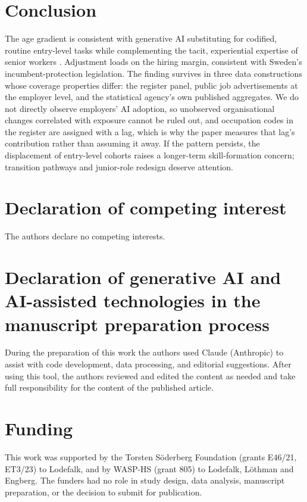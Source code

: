 \documentclass[preprint,12pt,authoryear]{elsarticle}
\begin{document}
\section{Conclusion}\label{sec:conc}

The age gradient is consistent with generative AI substituting for codified, routine entry-level tasks while complementing the tacit, experiential expertise of senior workers \citep{acemoglu2019automation,acemoglu2026proworker}. Adjustment loads on the hiring margin, consistent with Sweden's incumbent-protection legislation. The finding survives in three data constructions whose coverage properties differ: the register panel, public job advertisements at the employer level, and the statistical agency's own published aggregates. We do not directly observe employers' AI adoption, so unobserved organisational changes correlated with exposure cannot be ruled out, and occupation codes in the register are assigned with a lag, which is why the paper measures that lag's contribution rather than assuming it away. If the pattern persists, the displacement of entry-level cohorts raises a longer-term skill-formation concern; transition pathways and junior-role redesign deserve attention.


\section*{Declaration of competing interest}
The authors declare no competing interests.

\section*{Declaration of generative AI and AI-assisted technologies in the manuscript preparation process}
During the preparation of this work the authors used Claude (Anthropic) to assist with code development, data processing, and editorial suggestions. After using this tool, the authors reviewed and edited the content as needed and take full responsibility for the content of the published article.

\section*{Funding}
This work was supported by the Torsten S\"oderberg Foundation (grants E46/21, ET3/23) to Lodefalk, and by WASP-HS (grant 805) to Lodefalk, L\"othman and Engberg. The funders had no role in study design, data analysis, manuscript preparation, or the decision to submit for publication.
\end{document}
